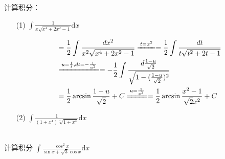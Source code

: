 \begin{xiti}
\begin{enumerate}
	\end{enumerate}	

\item 计算积分：
\begin{enumerate}
	\item[(1)] $\int \frac { 1 } { x \sqrt { x ^ { 4 } + 2 x ^ { 2 } - 1 } } \mathrm { d } x$
		\begin{solution}
			\begin{align*}
				&=\frac{1 }{2} \int  \frac{d x^2}{x^2 \sqrt{x^4+2x^2-1}} \xlongequal{t=x^2 } =\frac{1 }{2} \int  \frac{d t}{t \sqrt{t^2+2t-1}} \\
				& \xlongequal{u= \frac{1}{t},dt= -\frac{1}{u^2}}= - \frac{1}{2} \int \frac{d \frac{1-u}{\sqrt{2}} }{\sqrt{1-(\frac{1-u}{\sqrt{2}})^2}}\\
				&=  \frac{1}{2} \arcsin \frac{1-u}{\sqrt {2}} +C \xlongequal{u= \frac{1}{x^2}}=  \frac{1}{2} \arcsin \frac{x^2-1}{\sqrt {2} x^2} +C 
			\end{align*}
		\end{solution}	

 
	\item[(2)]  $\int \frac { 1 } { \left( 1 + x ^ { 4 } \right) \sqrt [ 4 ] { 1 + x ^ { 4 } } } \mathrm { d } x$
		\begin{solution}
			\begin{align*}
			\end{align*}
		\end{solution}	
\end{enumerate}	
\item 计算积分
$\int \frac { \cos ^ { 2 } x } { \sin x + \sqrt { 3 } \cos x }\mathrm{d}x$

	\begin{solution}
		\begin{align*}
		\end{align*}
	\end{solution}


\end{xiti}
